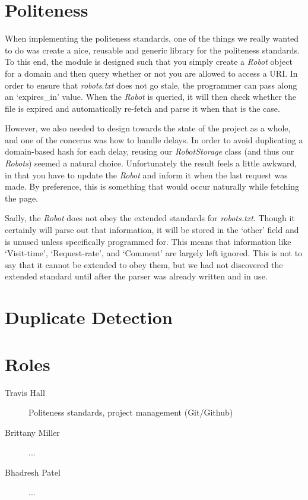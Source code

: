 \documentclass[letterpaper,11pt,twoside]{article}
\begin{document}
\section{Politeness}
When implementing the politeness standards, one of the things we really wanted to do was create a nice, reusable and generic library for the politeness standards. To this end, the module is designed such that you simply create a \emph{Robot} object for a domain and then query whether or not you are allowed to access a URI. In order to ensure that \emph{robots.txt} does not go stale, the programmer can pass along an `expires\_in' value. When the \emph{Robot} is queried, it will then check whether the file is expired and automatically re-fetch and parse it when that is the case.

However, we also needed to design towards the state of the project as a whole, and one of the concerns was how to handle delays. In order to avoid duplicating a domain-based hash for each delay, reusing our \emph{RobotStorage} class (and thus our \emph{Robots}) seemed a natural choice. Unfortunately the result feels a little awkward, in that you have to update the \emph{Robot} and inform it when the last request was made. By preference, this is something that would occur naturally while fetching the page.

Sadly, the \emph{Robot} does not obey the extended standards for \emph{robots.txt}. Though it certainly will parse out that information, it will be stored in the `other' field and is unused unless specifically programmed for. This means that information like `Visit-time', `Request-rate', and `Comment' are largely left ignored. This is not to say that it cannot be extended to obey them, but we had not discovered the extended standard until after the parser was already written and in use.

\section{Duplicate Detection}

\section{Roles}

\begin{description}
 \item[Travis Hall] Politeness standards, project management (Git/Github)
 \item[Brittany Miller] ... 
 \item[Bhadresh Patel] ...
\end{description}
\end{document}
